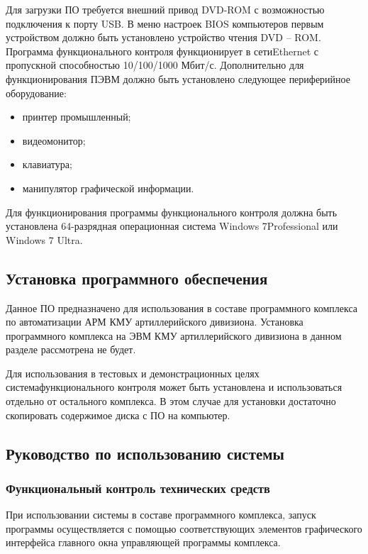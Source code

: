 Для загрузки ПО требуется внешний привод DVD-ROM с возможностью подключения к порту USB.
В меню настроек BIOS компьютеров первым устройством должно быть установлено устройство чтения DVD -- ROM.
Программа функционального контроля функционирует в сети\break Ethernet с пропускной способностью 10/100/1000 Мбит/с.
Дополнительно для функционирования ПЭВМ должно быть установлено следующее периферийное оборудование:

\begin{itemize}
	\item принтер промышленный;
	\item видеомонитор;
	\item клавиатура;
	\item манипулятор графической информации.
\end{itemize}

Для функционирования программы функционального контроля должна быть установлена 64-разрядная
операционная система Windows 7\break Professional или Windows 7 Ultra.

\subsection{Установка программного обеспечения}
\label{sub:guide:intstallation}

Данное ПО предназначено для использования в составе программного комплекса по автоматизации АРМ КМУ
артиллерийского дивизиона.
Установка программного комплекса на ЭВМ КМУ артиллерийского дивизиона в данном разделе
рассмотрена не будет.

Для использования в тестовых и демонстрационных целях система\break функционального контроля может быть установлена и
использоваться отдельно от остального комплекса.
В этом случае для установки достаточно скопировать содержимое диска
с ПО на компьютер.

\subsection{Руководство по использованию системы}
\label{sub:guide:user_guide}

\subsubsection{Функциональный контроль технических средств}
\label{sub:guide:user_guide:func}
При использовании системы в составе программного комплекса, запуск программы осуществляется с помощью соответствующих
элементов графического интерфейса главного окна управляющей программы комплекса.

